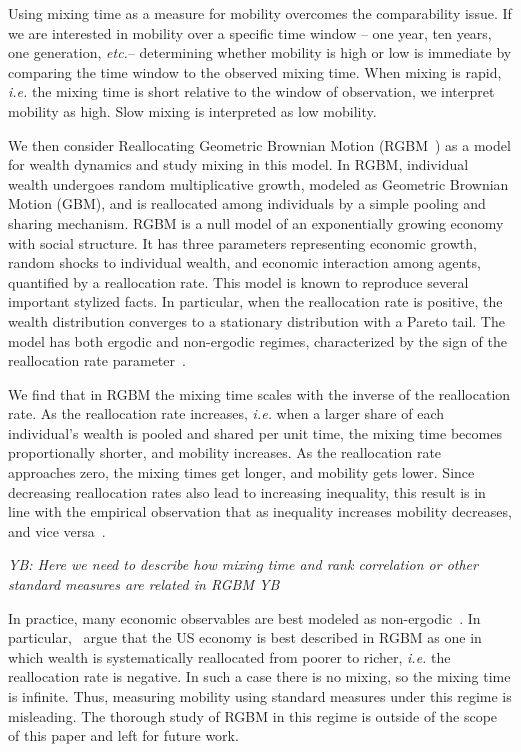 \documentclass[11pt]{article}
\newcommand{\blue}[1]{{\color{blue} #1}}
\newcommand{\ie}{{\it i.e.}\xspace}
\newcommand{\etc}{{\it etc.}\xspace}
\newcommand{\YB}[1]{\blue{{\it YB: #1 YB}}}
\numberwithin{equation}{section}
\begin{document}
Using mixing time as a measure for mobility overcomes the comparability issue. If we are interested in mobility over a specific time window -- one year, ten years, one generation, \etc -- determining whether mobility is high or low is immediate by comparing the time window to the observed mixing time. When mixing is rapid, \ie the mixing time is short relative to the window of observation, we interpret mobility as high. Slow mixing is interpreted as low mobility.

We then consider Reallocating Geometric Brownian Motion (RGBM~\citep{MarsiliMaslovZhang1998,LiuSerota2017,BermanPetersAdamou2019}) as a model for wealth dynamics and study mixing in this model. In RGBM, individual wealth undergoes random multiplicative growth, modeled as Geometric Brownian Motion (GBM), and is reallocated among individuals by a simple pooling and sharing mechanism. RGBM is a null model of an exponentially growing economy with social structure. It has three parameters representing economic growth, random shocks to individual wealth, and economic interaction among agents, quantified by a reallocation rate. This model is known to reproduce several important stylized facts. In particular, when the reallocation rate is positive, the wealth distribution converges to a stationary distribution with a Pareto tail. The model has both ergodic and non-ergodic regimes, characterized by the sign of the reallocation rate parameter~\citep{BermanPetersAdamou2019}.

We find that in RGBM the mixing time scales with the inverse of the reallocation rate. As the reallocation rate increases, \ie when a larger share of each individual's wealth is pooled and shared per unit time, the mixing time becomes proportionally shorter, and mobility increases. As the reallocation rate approaches zero, the mixing times get longer, and mobility gets lower. Since decreasing reallocation rates also lead to increasing inequality, this result is in line with the empirical observation that as inequality increases mobility decreases, and vice versa~\citep{corak2013}.

\YB{Here we need to describe how mixing time and rank correlation or other standard measures are related in RGBM}

In practice, many economic observables are best modeled as non-ergodic~\citep{Peters2019b}. In particular,~\citet{BermanPetersAdamou2019} argue that the US economy is best described in RGBM as one in which wealth is systematically reallocated from poorer to richer, \ie the reallocation rate is negative. In such a case there is no mixing, so the mixing time is infinite. Thus, measuring mobility using standard measures under this regime is misleading. The thorough study of RGBM in this regime is outside of the scope of this paper and left for future work.
\end{document}
